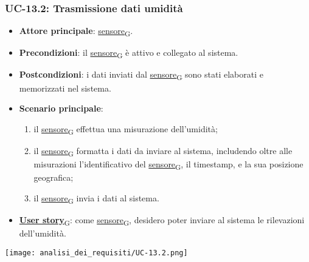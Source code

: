 \newpage

\subsubsection{UC-13.2: Trasmissione dati umidità}
\begin{itemize}
	\item \textbf{Attore principale}: \href{https://7last.github.io/docs/rtb/documentazione-interna/glossario\#sensore}{sensore\textsubscript{G}}.
	\item \textbf{Precondizioni}: il \href{https://7last.github.io/docs/rtb/documentazione-interna/glossario\#sensore}{sensore\textsubscript{G}} è attivo e collegato al sistema.
	\item \textbf{Postcondizioni}: i dati inviati dal \href{https://7last.github.io/docs/rtb/documentazione-interna/glossario\#sensore}{sensore\textsubscript{G}} sono stati elaborati e memorizzati nel sistema.
	\item \textbf{Scenario principale}:
	      \begin{enumerate}
		      \item il \href{https://7last.github.io/docs/rtb/documentazione-interna/glossario\#sensore}{sensore\textsubscript{G}} effettua una misurazione dell'umidità;
		      \item il \href{https://7last.github.io/docs/rtb/documentazione-interna/glossario\#sensore}{sensore\textsubscript{G}} formatta i dati da inviare al sistema, includendo oltre alle misurazioni l'identificativo del \href{https://7last.github.io/docs/rtb/documentazione-interna/glossario\#sensore}{sensore\textsubscript{G}},
		            il timestamp, e la sua posizione geografica;
		      \item il \href{https://7last.github.io/docs/rtb/documentazione-interna/glossario\#sensore}{sensore\textsubscript{G}} invia i dati al sistema.
	      \end{enumerate}
	\item \href{https://7last.github.io/docs/rtb/documentazione-interna/glossario\#user-story}{\textbf{User story}\textsubscript{G}}: come \href{https://7last.github.io/docs/rtb/documentazione-interna/glossario\#sensore}{sensore\textsubscript{G}}, desidero poter inviare al sistema le rilevazioni dell'umidità.
\end{itemize}

\begin{center}
	\texttt{[image: analisi\_dei\_requisiti/UC-13.2.png]}
\end{center}

